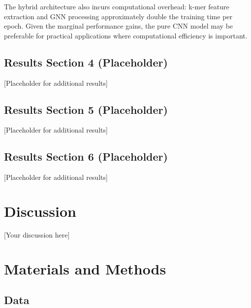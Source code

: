 \documentclass[12pt]{article}
\begin{document}
The hybrid architecture also incurs computational overhead: k-mer feature extraction and GNN processing approximately double the training time per epoch. Given the marginal performance gains, the pure CNN model may be preferable for practical applications where computational efficiency is important.



\subsection{Results Section 4 (Placeholder)}

[Placeholder for additional results]

\subsection{Results Section 5 (Placeholder)}

[Placeholder for additional results]

\subsection{Results Section 6 (Placeholder)}

[Placeholder for additional results]

\newpage
\section{Discussion}

[Your discussion here]

\newpage
\section{Materials and Methods}

\subsection{Data}
\end{document}
